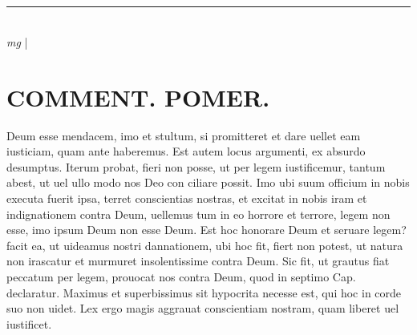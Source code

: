\documentclass{article}
\begin{document}
\begin{pages}
\subsection*{\textit{ }}\pstart    \pend
{}
{}
\subsection*{\textit{ }}\pstart              \pend
{}
{}
\subsection*{\textit{ }}\pstart   \pend
{}
{}
\subsection*{\textit{ }}
{}
\subsection*{\textit{ }}
{}
\subsection*{\textit{ }}\pstart   \pend
\vspace{0.5cm}\noindent
\vspace{0.2cm}\rule{1cm}{0.2pt}\\ 
\hspace{0.2cm}\textit{mg}
\footnotesize   
\normalsize| 
\section*{COMMENT. POMER.  }\pstart Deum esse mendacem, imo et stultum, si promitteret et dare uellet eam iusticiam, quam ante haberemus.  Est autem locus argumenti, ex absurdo desumptus.   \pend\pstart Iterum probat, fieri non posse, ut per legem iustificemur, tantum abest, ut uel ullo modo nos Deo con ciliare possit. Imo ubi suum officium in nobis executa fuerit ipsa, terret conscientias nostras, et excitat in nobis iram et indignationem contra Deum, uellemus tum in eo horrore et terrore, legem non esse, imo ipsum Deum non esse Deum. Est hoc honorare Deum et seruare legem? facit ea, ut uideamus nostri dannationem, ubi hoc fit, fiert non potest, ut natura non irascatur et murmuret insolentissime contra Deum.  Sic fit, ut grautus fiat peccatum per legem, prouocat nos contra Deum, quod in septimo Cap. declaratur.  Maximus et superbissimus sit hypocrita necesse est, qui hoc in corde suo non uidet. Lex ergo magis aggrauat conscientiam nostram, quam liberet uel iustificet.   \pend
{}
{}

\end{pages}
\end{document}
